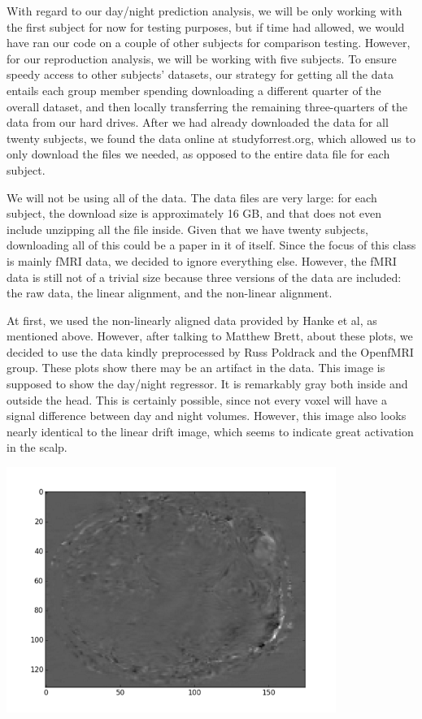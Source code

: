 \documentclass[11pt]{article}
\begin{document}
With regard to our day/night prediction analysis, we will be only working with  
the first subject for now for testing purposes, but if time had allowed, we     
would have ran our code on a couple of other subjects for comparison testing.   
However, for our reproduction analysis, we will be working with five subjects.  
To ensure speedy access to other subjects' datasets, our strategy for getting 
all the data entails each group member spending downloading a different quarter 
of the overall dataset, and then locally transferring the remaining 
three-quarters of the data from our hard drives.  After we had already 
downloaded the data for all twenty subjects, we found the data online at 
studyforrest.org, which allowed us to only download the files we needed, as 
opposed to the entire data file for each subject.  

We will not be using all of the data. The data files are very large: for each 
subject, the download size is approximately 16 GB, and that does not even 
include unzipping all the file inside. Given that we have twenty subjects, 
downloading all of this could be a paper in it of itself. Since the focus of 
this class is mainly fMRI data, we decided to ignore everything else. However, 
the fMRI data is still not of a trivial size because three versions of the data 
are included: the raw data, the linear alignment, and the non-linear alignment. 

At first, we used the non-linearly aligned data provided by Hanke et al, as
mentioned above.  However, after talking to Matthew Brett, about these plots, 
we decided to use the data kindly preprocessed by Russ Poldrack and the OpenfMRI
group.  These plots show there may be an artifact in the data.  This image is 
supposed to show the day/night regressor. It is remarkably gray both inside and 
outside the head.  This is certainly possible, since not every voxel will have 
a signal difference between day and night volumes.  However, this image also 
looks nearly identical to the linear drift image, which seems to indicate great
activation in the scalp.  
\begin{center}                                                                  
\includegraphics[height=8cm]{1}                                                 
\end{center}    
\end{document}
